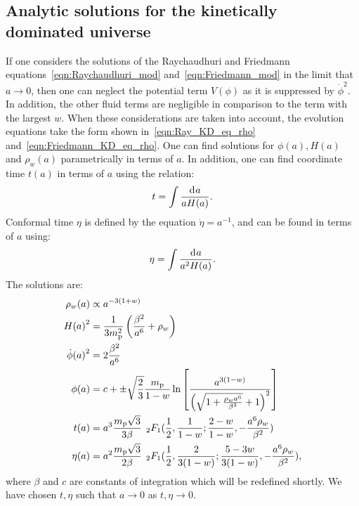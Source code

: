 \subsection{Analytic solutions for the kinetically dominated universe} 
If one considers the solutions of the Raychaudhuri and Friedmann equations~\eqref{eqn:Raychaudhuri_mod} and~\eqref{eqn:Friedmann_mod} in the limit that $a\to0$, then one can neglect the potential term $V(\phi)$ as it is suppressed by $\dot{\phi}^2$. In addition, the other fluid terms are negligible in comparison to the term with the largest $w$.  When these considerations are taken into account, the evolution equations take the form shown in~\eqref{eqn:Ray_KD_eq_rho} and~\eqref{eqn:Friedmann_KD_eq_rho}. One can find solutions for $\phi(a),H(a)$ and $\rho_w(a)$ parametrically in terms of $a$.  In addition, one can find coordinate time $t(a)$ in terms of $a$ using the relation:
%
\begin{equation}
  t = \int \frac{\operatorname{d}^{}\!{a}}{aH(a)}.
\end{equation}
%
Conformal time $\eta$ is defined by the equation $\dot{\eta} =
a^{-1}$, and can be found in terms of $a$ using:
%
\begin{equation}
  \eta = \int \frac{\operatorname{d}^{}\!{a}}{a^2H(a)}.
\end{equation}
%
The solutions are:
%
\begin{align}
  \rho_w(a) 
  &\propto 
  a^{-3(1+w)} 
  \\
  H{(a)}^2 
  &= 
  \frac{1}{3m_{\mathrm{p}}^2}\left(\frac{\beta^2}{a^6} + \rho_w\right)  
  \label{eqn:H_of_a}
  \\
  \dot{\phi}{(a)}^2
  &=
  2\frac{\beta^2}{a^6} 
  \label{eqn:dotphi_of_a}
  \\
  \phi(a)
  &=
  c + \pm
  \sqrt{\frac{2}{3}}\frac{m_{\mathrm{p}}}{1-w} \ln \left[ 
  \frac 
  {{a}^{3(1-w)}}
  {{\left(\sqrt{1+\frac{\rho_w{a}^{6}}{\beta^2}}+1\right)}^2} 
  \right]  
  \label{eqn:phi_of_a}
  \\
  t(a)
  &=
  a^3 \frac{m_{\mathrm{p}}\sqrt{3}}{3\beta} 
  \:\: 
  {_2F_1}(
  \frac{1}{2},
  \frac{1}{1-w};
  \frac{2-w}{1-w},
  -\frac{a^6\rho_w}{\beta^2}
  ) 
  \label{eqn:t_of_a}
  \\
  \eta(a) 
  &= 
  a^2 \frac{m_{\mathrm{p}}\sqrt{3}}{2\beta}
  \:\: 
  {_2F_1}(
  \frac{1}{2},
  \frac{2}{3(1-w)};
  \frac{5-3w}{3(1-w)},
  -\frac{a^6\rho_w}{\beta^2}
  ),
  \label{eqn:eta_of_a}
\end{align}
%
where $\beta$ and $c$ are constants of integration which will be redefined shortly. We have chosen $t,\eta$ such that $a\to0$ as $t,\eta \to 0$.


